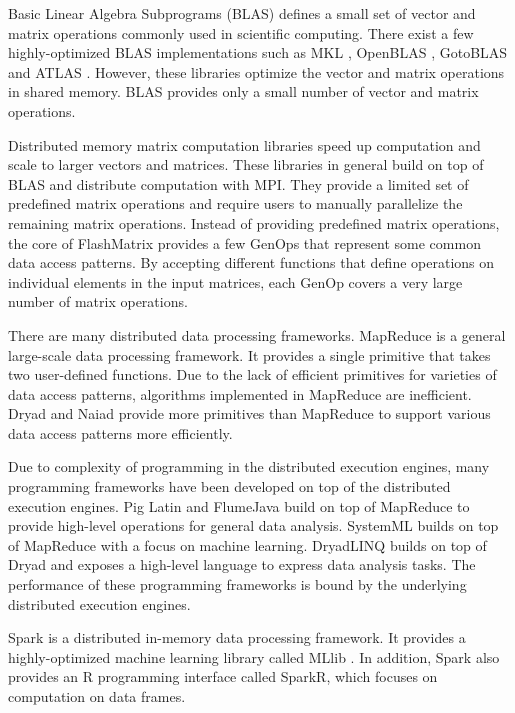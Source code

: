 Basic Linear Algebra Subprograms (BLAS) defines a small set of vector and
matrix operations commonly used in scientific computing. There exist a few
highly-optimized BLAS implementations such as MKL \cite{mkl}, OpenBLAS
\cite{openblas}, GotoBLAS \cite{Goto} and ATLAS \cite{atlas}. However, these
libraries optimize the vector and matrix operations in shared memory. BLAS
provides only a small number of vector and matrix operations.

Distributed memory matrix computation libraries \cite{trilinos, petsc, elemental}
speed up computation and scale to larger vectors and matrices. These libraries
in general build on top of BLAS and distribute computation with MPI.
They provide a limited set of predefined matrix operations and
require users to manually parallelize the remaining matrix operations. Instead
of providing predefined matrix operations, the core of FlashMatrix provides
a few GenOps that represent some common data access patterns. By accepting
different functions that define operations on individual elements in the input
matrices, each GenOp covers a very large number of matrix operations.

There are many distributed data processing frameworks.
MapReduce \cite{mapreduce} is a general large-scale data processing framework.
It provides a single primitive that takes two user-defined functions. 
Due to the lack of
efficient primitives for varieties of data access patterns, algorithms
implemented in MapReduce are inefficient. Dryad \cite{dryad} and
Naiad \cite{naiad} provide more primitives than MapReduce to support various
data access patterns more efficiently.

Due to complexity of programming in the distributed execution engines, many
programming frameworks have been developed on top of the distributed execution
engines. Pig Latin \cite{pig} and FlumeJava \cite{flumejava} build on top of
MapReduce to provide high-level operations for general data analysis. SystemML
\cite{systemml} builds on top of MapReduce with a focus on machine learning.
DryadLINQ \cite{dryadlinq} builds on top of Dryad and exposes a high-level
language to express data analysis tasks. The performance of these programming
frameworks is bound by the underlying distributed execution engines.

Spark \cite{spark} is a distributed in-memory data processing framework.
It provides a highly-optimized machine learning library called MLlib \cite{mllib}.
In addition, Spark also provides an R programming interface called SparkR, which
focuses on computation on data frames.

